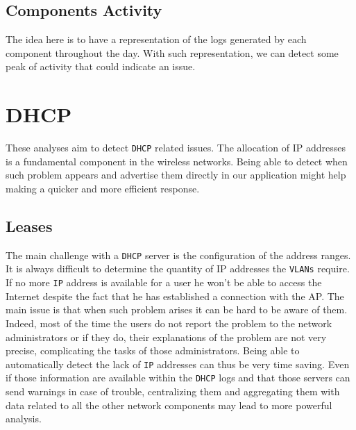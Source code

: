 \subsection{Components Activity}
The idea here is to have a representation of the logs generated by each component throughout the day. With such representation, we can detect some peak of activity that could indicate an issue.


\section{DHCP}
These analyses aim to detect \texttt{DHCP} related issues. The allocation of IP addresses is a fundamental component in the wireless networks. Being able to detect when such problem appears and advertise them directly in our application might help making a quicker and more efficient response.

\subsection{Leases}
The main challenge with a \texttt{DHCP} server is the configuration of the address ranges. It is always difficult to determine the quantity of IP addresses the \texttt{VLANs} require. If no more \texttt{IP} address is available for a user he won't be able to access the Internet despite the fact that he has established a connection with the AP. The main issue is that when such problem arises it can be hard to be aware of them. Indeed, most of the time the users do not report the problem to the network administrators or if they do, their explanations of the problem are not very precise, complicating the tasks of those administrators. Being able to automatically detect the lack of \texttt{IP} addresses can thus be very time saving. Even if those information are available within the \texttt{DHCP} logs and that those servers can send warnings in case of trouble, centralizing them and aggregating them with data related to all the other network components may lead to more powerful analysis.

